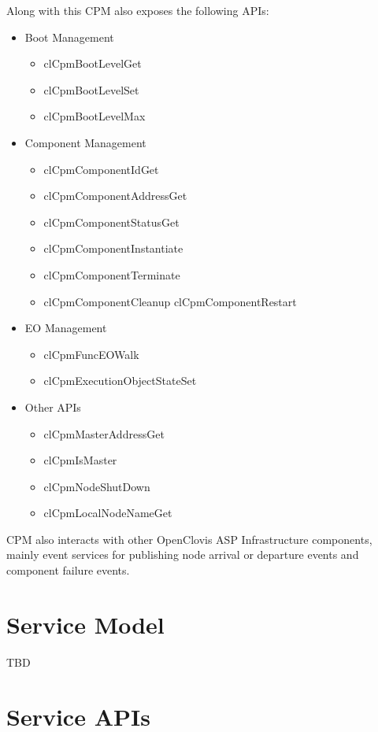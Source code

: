 Along with this CPM also exposes the following APIs:\begin{itemize}
\item Boot Management\begin{itemize}
\item cl\-Cpm\-Boot\-Level\-Get\item cl\-Cpm\-Boot\-Level\-Set\item cl\-Cpm\-Boot\-Level\-Max\end{itemize}
\item Component Management\begin{itemize}
\item cl\-Cpm\-Component\-Id\-Get\item cl\-Cpm\-Component\-Address\-Get\item cl\-Cpm\-Component\-Status\-Get\item cl\-Cpm\-Component\-Instantiate\item cl\-Cpm\-Component\-Terminate\item cl\-Cpm\-Component\-Cleanup cl\-Cpm\-Component\-Restart\end{itemize}
\item EO Management\begin{itemize}
\item cl\-Cpm\-Func\-EOWalk\item cl\-Cpm\-Execution\-Object\-State\-Set\end{itemize}
\item Other APIs\begin{itemize}
\item cl\-Cpm\-Master\-Address\-Get\item cl\-Cpm\-Is\-Master\item cl\-Cpm\-Node\-Shut\-Down\item cl\-Cpm\-Local\-Node\-Name\-Get\end{itemize}
\end{itemize}


\par CPM also interacts with other Open\-Clovis ASP Infrastructure components, mainly event services for 
publishing node arrival or departure events and component failure events. 


\chapter{Service Model}
TBD

\chapter{Service APIs}

